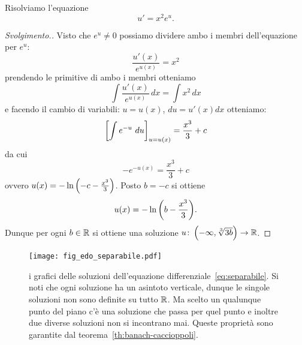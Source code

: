 \begin{example}
Risolviamo l'equazione 
\begin{equation}\label{eq:separabile}
  u' = x^2 e^u.
\end{equation}
\end{example}
%
\begin{proof}[Svolgimento.]
Visto che $e^u \neq 0$ possiamo dividere ambo i membri dell'equazione 
per $e^u$:
\[
  \frac{u'(x)}{e^{u(x)}} = x^2  
\]
prendendo le primitive di ambo i membri otteniamo
\[
 \int\frac{u'(x)}{e^{u(x)}}\, dx  = \int x^2\, dx 
\]
e facendo il cambio di variabili: $u=u(x)$, $du = u'(x) dx$ 
otteniamo:
\[
  {\left[ \int e^{-u}\, \, du \right]}_{u=u(x)} = \frac{x^3}{3} + c
\]
da cui 
\[
  -e^{-u(x)} = \frac{x^3}{3} + c
\]
ovvero $u(x) = -\ln{\left( -c -  \frac{x^3}{3} \right)}$.
Posto $b=-c$
si ottiene 
\[
  u(x) = -\ln {\left( b-\frac{x^3}{3} \right)}.
\]
Dunque per ogni $b\in {\mathbb R}$ si ottiene una soluzione 
$u\colon \left(-\infty,\sqrt[3]{3b}\right)\to {\mathbb R}$.
\end{proof}
%
\newsavebox{\qrseparabile}
\begin{figure}
\centering
\texttt{[image: fig\_edo\_separabile.pdf]}
\caption{i grafici delle soluzioni dell'equazione differenziale~\eqref{eq:separabile}.
Si noti che ogni soluzione ha un asintoto verticale, dunque le singole 
soluzioni non sono definite su tutto ${\mathbb R}$.
Ma scelto un qualunque punto del piano c'è una soluzione che passa per 
quel punto e inoltre due diverse soluzioni non si incontrano mai.
Queste proprietà sono garantite dal teorema~\ref{th:banach-caccioppoli}.
\ifwidemargin\\\\\fi%
\usebox{\qrseparabile}}
\label{fig:separabile}
\end{figure}

